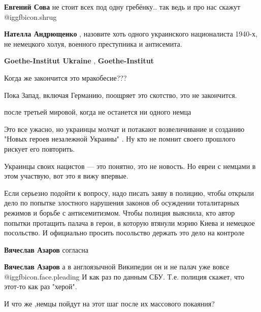 \begin{itemize}
\begin{itemize}
\textbf{Евгений Сова} не стоит всех под одну гребёнку.. так ведь и про нас скажут  @igg{fbicon.shrug} 

\textbf{Нателла Андрющенко} , назовите хоть одного украинского националиста 1940-х, не немецкого холуя, военного преступника и антисемита.
\end{itemize} %

\textbf{Goethe-Institut Ukraine} , \textbf{Goethe-Institut}

Когда же закончится это мракобесие???

\begin{itemize} %
Пока Запад, включая Германию, поощряет это скотство, это не закончится.

после третьей мировой, когда не останется ни одного немца
\end{itemize} %


Это все ужасно, но украинцы молчат и потакают возвеличивание и созданию "Новых
героев незалежной Украины" . Ну кто не помнит своего прошлого рискует его
повторить.

\begin{itemize} %
Украинцы своих нацистов — это понятно, это не новость. Но евреи с немцами в этом участвую, вот это я вижу впервые.
\end{itemize} %


Если серьезно подойти к вопросу, надо писать заяву в полицию, чтобы открыли
дело по попытке злостного нарушения законов об осуждении тоталитарных режимов и
борьбе с антисемитизмом. Чтобы полиция выяснила, кто автор попытки протащить
палача в герои, в которую втянули мэрию Киева и немецкое посольство. И
официально просить посольство держать это дело на контроле

\begin{itemize} %
\textbf{Вячеслав Азаров} согласна

\textbf{Вячеслав Азаров} а в англоязычной Википедии он и не палач уже вовсе  @igg{fbicon.face.pleading} 
И как раз по данным СБУ. Т.е. полиция скажет, что этот-то как раз "херой".
\end{itemize} %

И что же ,немцы пойдут на этот шаг после их массового покаяния?


\end{itemize}
